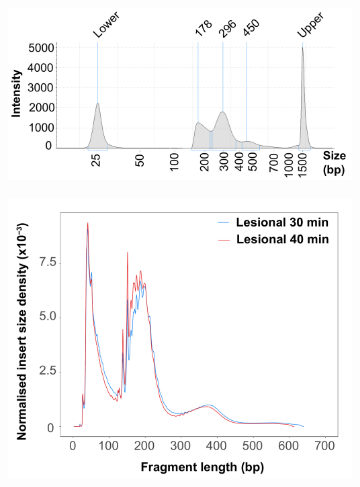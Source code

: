\begin{figure}[htbp]
\centering
\begin{subfigure}{0.7\textwidth}
\centering
\includegraphics[width=\textwidth]{./Results1/pdfs/ATAC_PS02_tapestation_30min}
\caption{\textbf{}}
\end{subfigure}
\begin{subfigure}{0.45\textwidth}
\centering
\includegraphics[width=\textwidth]{./Results1/pdfs/ATAC_PS-2_30_40_min_fragment_size_distribution}
\caption{\textbf{}}
\end{subfigure}%
\begin{subfigure}{0.45\textwidth}
\centering

\end{subfigure}
\end{figure}
